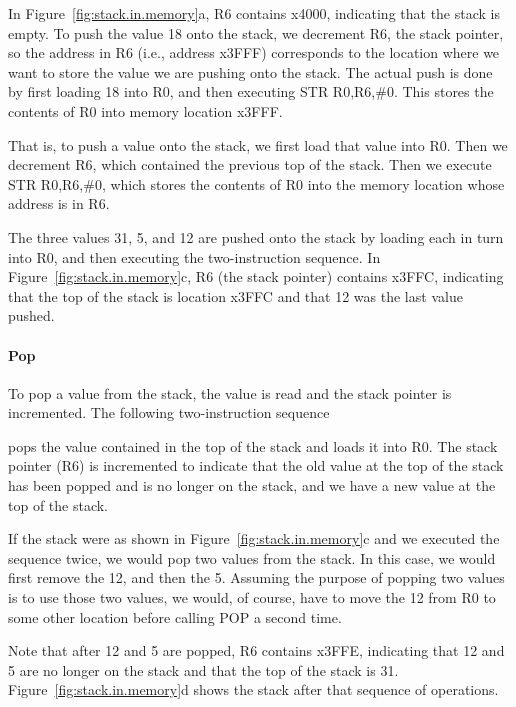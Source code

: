 \documentclass{patt}
\begin{document}
\noindent
In Figure~\ref{fig:stack.in.memory}a, R6 contains x4000, indicating that
the stack is empty.  To push the value 18 onto the stack, we decrement R6, 
the stack pointer, so the address in R6 (i.e., address x3FFF) corresponds 
to the location where we want to store the value we are pushing onto the
stack.  The actual push is done by first loading 18 into R0, and then 
executing STR R0,R6,\#0. This stores the contents of R0 into memory location 
x3FFF.

That is, to push a value onto the stack, we first load that value into R0.
Then we decrement R6, which contained the previous top of the stack.
Then we execute STR R0,R6,\#0, which stores the contents of R0 into the memory 
location whose address is in R6.  

The three values 31, 5, and 12 are pushed onto the stack by loading
each in turn into R0, and then executing the two-instruction sequence.
In Figure~\ref{fig:stack.in.memory}c, R6 (the stack pointer) contains
x3FFC, indicating that the top of the stack is location x3FFC and that
12 was the last value pushed.

\paragraph{Pop}

To pop a value from the stack, the value is read and the stack pointer
is incremented. The following two-instruction sequence


\noindent pops the value contained in the top of the stack and loads it into 
R0.  The stack pointer (R6) is incremented to indicate that the old value at 
the top of the stack has been popped and is no longer on the stack, and we have
a new value at the top of the stack.

If the stack were as shown in Figure~\ref{fig:stack.in.memory}c and we
executed the sequence twice, we would pop two values from the
stack. In this case, we would first remove the 12, and then the 5.  Assuming 
the purpose of popping two values is to use those two values, we would, of 
course, have to move the 12 from R0 to some other location before calling POP 
a second time.

Note that after 12 and 5 are popped, R6 contains x3FFE, indicating that 12 
and 5 are no longer on the stack and that the top of the stack is 31.  
Figure~\ref{fig:stack.in.memory}d shows the stack after that sequence
of operations. 
\end{document}
